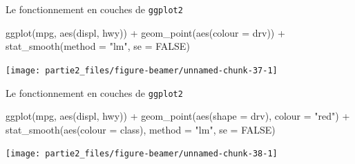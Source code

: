 \documentclass[12pt,ignorenonframetext,]{beamer}
\newenvironment{Shaded}{}{}
\newcommand{\KeywordTok}[1]{\textcolor[rgb]{0.00,0.00,1.00}{#1}}
\newcommand{\DataTypeTok}[1]{#1}
\newcommand{\StringTok}[1]{\textcolor[rgb]{0.00,0.50,0.50}{#1}}
\newcommand{\OtherTok}[1]{\textcolor[rgb]{1.00,0.25,0.00}{#1}}
\newcommand{\OperatorTok}[1]{#1}
\newcommand{\NormalTok}[1]{#1}
\renewenvironment{Shaded}{\begin{snugshade}}{\end{snugshade}}
\begin{document}
\begin{frame}[fragile]{\large Le fonctionnement en \og couches \fg{} de
\texttt{ggplot2}}

\footnotesize \center

\begin{Shaded}
\begin{Highlighting}[]
\KeywordTok{ggplot}\NormalTok{(mpg, }\KeywordTok{aes}\NormalTok{(displ, hwy)) }\OperatorTok{+}\StringTok{ }
\StringTok{  }\KeywordTok{geom_point}\NormalTok{(}\KeywordTok{aes}\NormalTok{(}\DataTypeTok{colour =}\NormalTok{ drv)) }\OperatorTok{+}\StringTok{ }
\StringTok{  }\KeywordTok{stat_smooth}\NormalTok{(}\DataTypeTok{method =} \StringTok{"lm"}\NormalTok{, }\DataTypeTok{se =} \OtherTok{FALSE}\NormalTok{)}
\end{Highlighting}
\end{Shaded}

\texttt{[image: partie2\_files/figure-beamer/unnamed-chunk-37-1]}

\end{frame}

\begin{frame}[fragile]{\large Le fonctionnement en \og couches \fg{} de
\texttt{ggplot2}}

\footnotesize \center

\begin{Shaded}
\begin{Highlighting}[]
\KeywordTok{ggplot}\NormalTok{(mpg, }\KeywordTok{aes}\NormalTok{(displ, hwy)) }\OperatorTok{+}\StringTok{ }
\StringTok{  }\KeywordTok{geom_point}\NormalTok{(}\KeywordTok{aes}\NormalTok{(}\DataTypeTok{shape =}\NormalTok{ drv), }\DataTypeTok{colour =} \StringTok{"red"}\NormalTok{) }\OperatorTok{+}\StringTok{ }
\StringTok{  }\KeywordTok{stat_smooth}\NormalTok{(}\KeywordTok{aes}\NormalTok{(}\DataTypeTok{colour =}\NormalTok{ class), }\DataTypeTok{method =} \StringTok{"lm"}\NormalTok{, }\DataTypeTok{se =} \OtherTok{FALSE}\NormalTok{)}
\end{Highlighting}
\end{Shaded}

\texttt{[image: partie2\_files/figure-beamer/unnamed-chunk-38-1]}

\end{frame}
\end{document}
